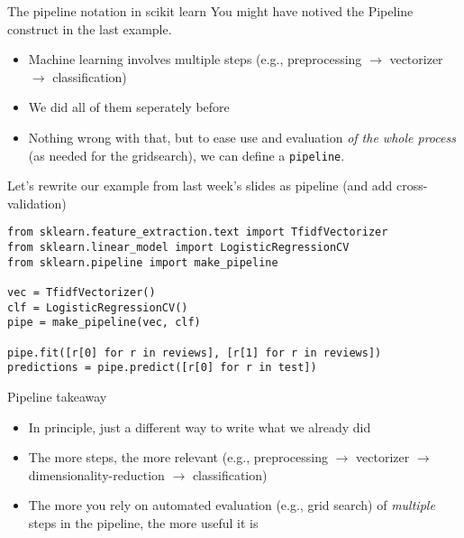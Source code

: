\begin{frame}{The pipeline notation in scikit learn}
You might have notived the Pipeline construct in the last example.
\begin{itemize}
\item Machine learning involves multiple steps (e.g., preprocessing $\rightarrow$ vectorizer $\rightarrow$ classification)
\item We did all of them seperately before
\item Nothing wrong with that, but to ease use and evaluation \emph{of the whole process} (as needed for the gridsearch), we can define a \texttt{pipeline}.
\end{itemize}
	
\end{frame}

\begin{frame}[fragile]{Let's rewrite our example from last week's slides as pipeline (and add cross-validation)}
\begin{verbatim}
from sklearn.feature_extraction.text import TfidfVectorizer
from sklearn.linear_model import LogisticRegressionCV
from sklearn.pipeline import make_pipeline

vec = TfidfVectorizer()
clf = LogisticRegressionCV()
pipe = make_pipeline(vec, clf)

pipe.fit([r[0] for r in reviews], [r[1] for r in reviews])
predictions = pipe.predict([r[0] for r in test])
\end{verbatim}
\end{frame}

\begin{frame}{Pipeline takeaway}
  \begin{itemize}
  \item In principle, just a different way to write what we already did
  \item The more steps, the more relevant (e.g., preprocessing $\rightarrow$ vectorizer $\rightarrow$ dimensionality-reduction $\rightarrow$ classification)
  \item The more you rely on automated evaluation (e.g., grid search) of \emph{multiple} steps in the pipeline, the more useful it is
  \end{itemize}
\end{frame}




